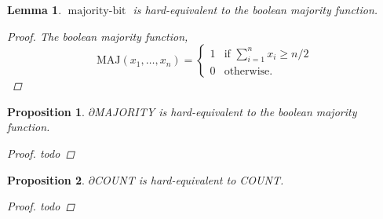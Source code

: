 \documentclass{article} %
\newtheorem{prop}{Proposition}
\newtheorem{lemma}{Lemma}
\begin{document}
\begin{lemma}
$\operatorname{majority-bit}$ is hard-equivalent to the boolean majority function.
\begin{proof}
	The boolean majority function,
\begin{equation*}
\text{MAJ}(x_{1}, \dots, x_{n}) = 
\begin{cases}
1 & \text{if } \sum_{i=1}^{n} x_{i} \geq n/2 \\
0 & \text{otherwise.}
\end{cases}
\end{equation*}
\end{proof}
\end{lemma}

\begin{prop}\label{prop:majority}
	$\partial${MAJORITY} is hard-equivalent to the boolean majority function.
\begin{proof}
	todo
\end{proof}
\end{prop}

\begin{prop}\label{prop:count}
	$\partial${COUNT} is hard-equivalent to COUNT.
	\begin{proof}
		todo
	\end{proof}
\end{prop}
\end{document}
